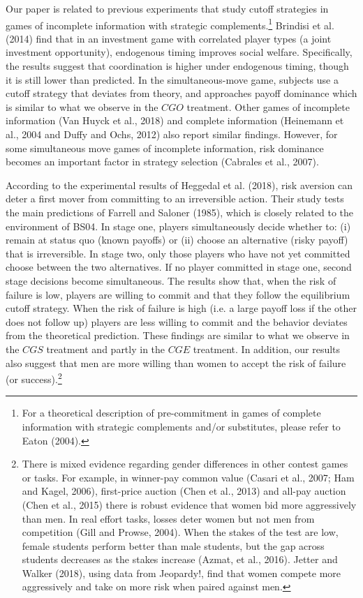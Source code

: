 \documentclass[11pt,english]{article}
\begin{document}
Our paper is related to previous experiments that study cutoff strategies in games of incomplete information with strategic complements.\footnote{For a theoretical description of pre-commitment in games of complete information with strategic complements and/or substitutes, please refer to Eaton (2004).} Brindisi et al. (2014) find that in an investment game with correlated player types (a joint investment opportunity), endogenous timing improves social welfare. Specifically, the results suggest that coordination is higher under endogenous timing, though it is still lower than predicted. In the simultaneous-move game, subjects use a cutoff strategy that deviates from theory, and approaches payoff dominance which is similar to what we observe in the $CGO$ treatment. Other games of incomplete information (Van Huyck et al., 2018) and complete information (Heinemann et al., 2004 and Duffy and Ochs, 2012) also report similar findings. However, for some simultaneous move games of incomplete information, risk dominance becomes an important factor in strategy selection (Cabrales et al., 2007).

According to the experimental results of Heggedal et al. (2018), risk aversion can deter a first mover from committing to an irreversible action. Their study tests the main predictions of Farrell and Saloner (1985), which is closely related to the environment of BS04. In stage one, players simultaneously decide whether to: (i) remain at status quo (known payoffs) or (ii) choose an alternative (risky payoff) that is irreversible. In stage two, only those players who have not yet committed choose between the two alternatives. If no player committed in stage one, second stage decisions become simultaneous. The results show that, when the risk of failure is low, players are willing to commit and that they follow the equilibrium cutoff strategy. When the risk of failure is high (i.e. a large payoff loss if the other does not follow up) players are less willing to commit and the behavior deviates from the theoretical prediction. These findings are similar to what we observe in the $CGS$ treatment and partly in the $CGE$ treatment. In addition, our results also suggest that men are more willing than women to accept the risk of failure (or success).\footnote{There is  mixed evidence regarding gender differences in other contest games or tasks. For example, in winner-pay common value (Casari et al., 2007; Ham and Kagel, 2006), first-price auction (Chen et al., 2013) and all-pay auction (Chen et al., 2015) there is robust evidence that women bid more aggressively than men. In real effort tasks, losses deter women but not men from competition (Gill and Prowse, 2004). When the stakes of the test are low, female students perform better than male students, but the gap across students decreases as the stakes increase (Azmat, et al., 2016). Jetter and Walker (2018), using data from Jeopardy!, find that women compete more aggressively and take on more risk when paired against men.} 
\end{document}
